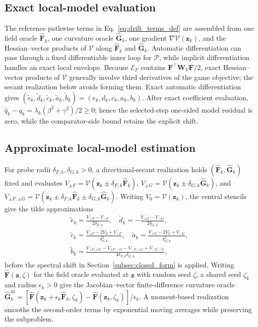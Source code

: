 \documentclass{article}
\theoremstyle{remark}
\newcommand{\bz}{\boldsymbol{z}}
\newcommand{\bW}{\boldsymbol{W}}
\newcommand{\bF}{\boldsymbol{F}}
\newcommand{\hatF}{\widehat{\boldsymbol{F}}}
\newcommand{\hatG}{\widehat{\boldsymbol{G}}}
\newcommand{\Vk}{\mathcal{V}}
\newcommand{\cE}{\mathcal{E}}
\newcommand{\cP}{\mathcal{P}}
\begin{document}
\subsection{Exact local-model evaluation}
The reference pathwise terms in Eq.~\eqref{eq:drift_terms_def} are assembled from one field oracle $\hatF_{k}$, one curvature oracle $\hatG_{k}$, one gradient $\nabla\Vk(\bz_k)$, and the Hessian--vector products of $\Vk$ along $\hatF_k$ and $\hatG_k$.
Automatic differentiation can pass through a fixed differentiable inner loop for $\cP$, while implicit differentiation handles an exact local envelope.
Because $\cE_F$ contains $\bF^\top\bW_V\bF/2$, exact Hessian--vector products of $\Vk$ generally involve third derivatives of the game objective; the secant realization below avoids forming them.
Exact automatic differentiation gives $(\tilde e_k,\tilde d_k,\tilde c_k,\tilde a_k,\tilde b_k)=(e_k,d_k,c_k,a_k,b_k)$.
After exact coefficient evaluation, $\hat q_k-q_k=\lambda_k(\beta^2+\gamma^2)/2\ge0$; hence the selected-step one-sided model residual is zero, while the comparator-side bound retains the explicit shift.

\subsection{Approximate local-model estimation}
For probe radii $\delta_{F,k},\delta_{G,k}>0$, a directional-secant realization holds $(\hatF_k,\hatG_k)$ fixed and evaluates $V_{\pm F}=\Vk(\bz_k\pm\delta_{F,k}\hatF_k)$, $V_{\pm G}=\Vk(\bz_k\pm\delta_{G,k}\hatG_k)$, and $V_{\pm F,\pm G}=\Vk(\bz_k\pm\delta_{F,k}\hatF_k \pm\delta_{G,k}\hatG_k)$.
Writing $V_0=\Vk(\bz_k)$, the central stencils give the tilde approximations
\[
\begin{gathered}
\tilde e_k=\frac{V_{+F}-V_{-F}}{2\delta_{F,k}},\quad
\tilde d_k=-\frac{V_{+G}-V_{-G}}{2\delta_{G,k}},\\
\tilde c_k=\frac{V_{+F}-2V_0+V_{-F}}{\delta_{F,k}^2},\quad
\tilde a_k=\frac{V_{+G}-2V_0+V_{-G}}{\delta_{G,k}^2},\\
\tilde b_k=\frac{V_{+F,+G}-V_{+F,-G}-V_{-F,+G}+V_{-F,-G}}
{4\delta_{F,k}\delta_{G,k}},
\end{gathered}
\]
before the spectral shift in Section~\ref{subsec:closed_form} is applied.
Writing $\hatF(\bz,\zeta)$ for the field oracle evaluated at $\bz$ with random seed $\zeta$, a shared seed $\zeta_k$ and radius $\epsilon_k>0$ give the Jacobian--vector finite-difference curvature oracle $\hatG_{k}^{\mathrm{fd}}=[\hatF(\bz_{k}+\epsilon_{k}\hatF_{k},\zeta_{k})-\hatF(\bz_{k},\zeta_{k})]/\epsilon_{k}$.
A moment-based realization smooths the second-order terms by exponential moving averages while preserving the subproblem.
\end{document}
